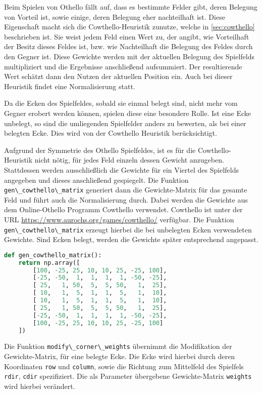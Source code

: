 Beim Spielen von Othello fällt auf, dass es bestimmte Felder gibt, deren
Belegung von Vorteil ist, sowie einige, deren Belegung eher nachteilhaft
ist. Diese Eigenschaft macht sich die Cowthello-Heuristik
\cite{cowthello} zunutze, welche in \ref{sec:cowthello} beschrieben ist.
Sie weist jedem Feld einen Wert zu, der angibt, wie Vorteilhaft der
Besitz dieses Feldes ist, bzw. wie Nachteilhaft die Belegung des Feldes
durch den Gegner ist. Diese Gewichte werden mit der aktuellen Belegung
des Spielfelds multipliziert und die Ergebnisse anschließend
aufsummiert. Der resultierende Wert schätzt dann den Nutzen der
aktuellen Position ein. Auch bei dieser Heuristik findet eine
Normalisierung statt.

Da die Ecken des Spielfeldes, sobald sie einmal belegt sind, nicht mehr
vom Gegner erobert werden können, spielen diese eine besondere Rolle.
Ist eine Ecke unbelegt, so sind die umliegenden Spielfelder anders zu
bewerten, als bei einer belegten Ecke. Dies wird von der Cowthello
Heuristik berücksichtigt.

Aufgrund der Symmetrie des Othello Spielfeldes, ist es für die
Cowthello-Heuristik nicht nötig, für jedes Feld einzeln dessen Gewicht
anzugeben. Stattdessen werden ausschließlich die Gewichte für ein
Viertel des Spielfelds angegeben und dieses anschließend gespiegelt. Die
Funktion \passthrough{\lstinline!gen\_cowthello\_matrix!} generiert dann
die Gewichte-Matrix für das gesamte Feld und führt auch die
Normalisierung durch. Dabei werden die Gewichte aus dem Online-Othello
Programm Cowthello \cite{cowthello} verwendet. Cowthello ist unter der
URL \url{https://www.aurochs.org/games/cowthello/} verfügbar. Die
Funktion \passthrough{\lstinline!gen\_cowthello\_matrix!} erzeugt
hierbei die bei unbelegten Ecken verwendeten Gewichte. Sind Ecken
belegt, werden die Gewichte später entsprechend angepasst.

\begin{lstlisting}[language=Python]
def gen_cowthello_matrix():
    return np.array([
        [100, -25, 25, 10, 10, 25, -25, 100],
        [-25, -50,  1,  1,  1,  1, -50, -25],
        [ 25,   1, 50,  5,  5, 50,   1,  25],
        [ 10,   1,  5,  1,  1,  5,   1,  10],
        [ 10,   1,  5,  1,  1,  5,   1,  10],
        [ 25,   1, 50,  5,  5, 50,   1,  25],
        [-25, -50,  1,  1,  1,  1, -50, -25],
        [100, -25, 25, 10, 10, 25, -25, 100]
    ])
\end{lstlisting}

Die Funktion \passthrough{\lstinline!modify\_corner\_weights!} übernimmt
die Modifikation der Gewichte-Matrix, für eine belegte Ecke. Die Ecke
wird hierbei durch deren Koordinaten \passthrough{\lstinline!row!} und
\passthrough{\lstinline!column!}, sowie die Richtung zum Mittelfeld des
Spielfels \passthrough{\lstinline!rdir!}, \passthrough{\lstinline!cdir!}
spezifiziert. Die als Parameter übergebene Gewichte-Matrix
\passthrough{\lstinline!weights!} wird hierbei verändert.

